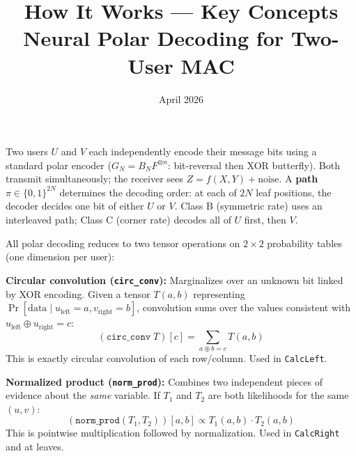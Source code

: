 \documentclass[11pt]{article}
\title{\textbf{How It Works --- Key Concepts}\\[4pt]
\large Neural Polar Decoding for Two-User MAC}
\author{}
\date{April 2026}
\begin{document}
\maketitle
\thispagestyle{empty}

\begin{concept}[title=1. MAC Polar Codes]
Two users $U$ and $V$ each independently encode their message bits using a standard polar encoder ($G_N = B_N F^{\otimes n}$: bit-reversal then XOR butterfly).
Both transmit simultaneously; the receiver sees $Z = f(X, Y) + \text{noise}$.
A \textbf{path} $\pi \in \{0,1\}^{2N}$ determines the decoding order: at each of $2N$ leaf positions, the decoder decides one bit of either $U$ or $V$.
Class B (symmetric rate) uses an interleaved path; Class C (corner rate) decodes all of $U$ first, then $V$.
\end{concept}

\begin{concept}[title=2. The Two Core Operations]
All polar decoding reduces to two tensor operations on $2 \times 2$ probability tables (one dimension per user):

\medskip
\textbf{Circular convolution (\texttt{circ\_conv}):} Marginalizes over an unknown bit linked by XOR encoding.
Given a tensor $T(a, b)$ representing $\Pr[\text{data} \mid u_{\text{left}}=a, v_{\text{right}}=b]$, convolution sums over the values consistent with $u_{\text{left}} \oplus u_{\text{right}} = c$:
\[
  (\texttt{circ\_conv}\; T)[c] = \sum_{a \oplus b = c} T(a, b)
\]
This is exactly circular convolution of each row/column. Used in \texttt{CalcLeft}.

\medskip
\textbf{Normalized product (\texttt{norm\_prod}):} Combines two independent pieces of evidence about the \emph{same} variable. If $T_1$ and $T_2$ are both likelihoods for the same $(u, v)$:
\[
  (\texttt{norm\_prod}(T_1, T_2))[a, b] \propto T_1(a, b) \cdot T_2(a, b)
\]
This is pointwise multiplication followed by normalization. Used in \texttt{CalcRight} and at leaves.
\end{concept}
\end{document}
